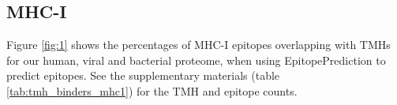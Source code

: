 \subsection{MHC-I}

Figure \ref{fig:1} shows the percentages of MHC-I epitopes overlapping 
with TMHs for our human, viral and bacterial proteome,
when using EpitopePrediction to predict epitopes.
See the supplementary materials (table \ref{tab:tmh_binders_mhc1}) 
for the TMH and epitope counts.



